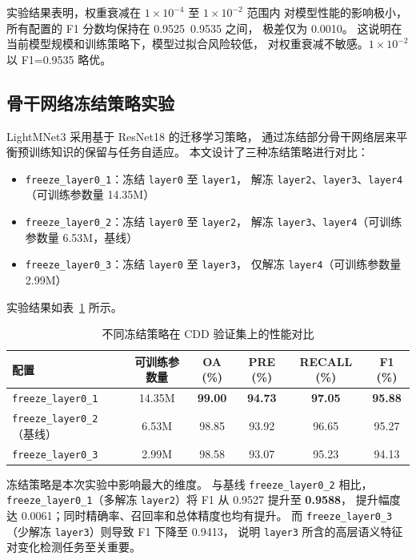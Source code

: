 \documentclass[UTF8]{ctexart}
\begin{document}
实验结果表明，权重衰减在 $1\times10^{-4}$ 至 $1\times10^{-2}$ 范围内
对模型性能的影响极小，所有配置的 F1 分数均保持在 0.9525~0.9535 之间，
极差仅为 0.0010。
这说明在当前模型规模和训练策略下，模型过拟合风险较低，
对权重衰减不敏感。$1\times10^{-2}$ 以 F1=0.9535 略优。

\subsection{骨干网络冻结策略实验}

LightMNet3 采用基于 ResNet18 的迁移学习策略，
通过冻结部分骨干网络层来平衡预训练知识的保留与任务自适应。
本文设计了三种冻结策略进行对比：
\begin{itemize}
    \item \texttt{freeze\_layer0\_1}：冻结 \texttt{layer0} 至 \texttt{layer1}，
          解冻 \texttt{layer2}、\texttt{layer3}、\texttt{layer4}（可训练参数量 14.35M）
    \item \texttt{freeze\_layer0\_2}：冻结 \texttt{layer0} 至 \texttt{layer2}，
          解冻 \texttt{layer3}、\texttt{layer4}（可训练参数量 6.53M，基线）
    \item \texttt{freeze\_layer0\_3}：冻结 \texttt{layer0} 至 \texttt{layer3}，
          仅解冻 \texttt{layer4}（可训练参数量 2.99M）
\end{itemize}

实验结果如表~\ref{tab:freeze_scan} 所示。

\begin{table}[htbp]
\centering
\caption{不同冻结策略在 CDD 验证集上的性能对比}
\label{tab:freeze_scan}
\begin{tabular}{lccccc}
\hline
配置 & 可训练参数量 & OA (\%) & PRE (\%) & RECALL (\%) & F1 (\%) \\
\hline
\texttt{freeze\_layer0\_1} & 14.35M & \textbf{99.00} & \textbf{94.73} & \textbf{97.05} & \textbf{95.88} \\
\texttt{freeze\_layer0\_2}（基线） & 6.53M & 98.85 & 93.92 & 96.65 & 95.27 \\
\texttt{freeze\_layer0\_3} & 2.99M & 98.58 & 93.07 & 95.23 & 94.13 \\
\hline
\end{tabular}
\end{table}

冻结策略是本次实验中影响最大的维度。
与基线 \texttt{freeze\_layer0\_2} 相比，
\texttt{freeze\_layer0\_1}（多解冻 \texttt{layer2}）将 F1 从 0.9527 提升至 \textbf{0.9588}，
提升幅度达 0.0061；同时精确率、召回率和总体精度也均有提升。
而 \texttt{freeze\_layer0\_3}（少解冻 \texttt{layer3}）则导致 F1 下降至 0.9413，
说明 \texttt{layer3} 所含的高层语义特征对变化检测任务至关重要。
\end{document}

